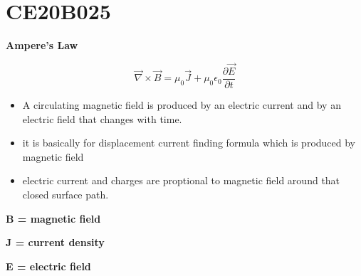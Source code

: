 \section{CE20B025}

\centerline{\huge \textbf{Ampere's Law}}

\begin{equation}
    \vec\nabla \times \vec B = \mu_0 \vec J + \mu_0 \epsilon_0 \frac{\partial \vec E}{\partial t}
\end{equation}


\begin{itemize}
    \item A circulating magnetic field is produced by an electric current and by an electric field that changes with time.
    
    \item it is basically for displacement current finding formula which is produced by magnetic field
    
    \item electric current and charges are proptional to magnetic field around that closed surface path.
\end{itemize}


\centerline{\textbf{B = magnetic field}}
\centerline{\textbf{J = current density}}
\centerline{\textbf{E = electric field}}

